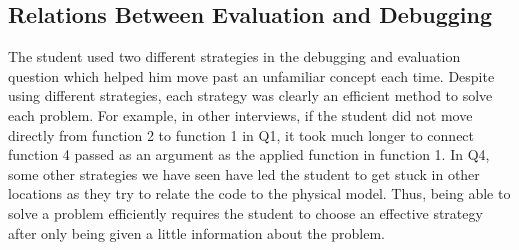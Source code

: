 \subsection{Relations Between Evaluation and Debugging}
%
%

The student used two different strategies in the debugging and evaluation question which helped him move past an unfamiliar concept each time. Despite using different strategies, each strategy was clearly an efficient method to solve each problem. For example, in other interviews, if the student did not move directly from function 2 to function 1 in Q1, it took much longer to connect function 4 passed as an argument as the applied function in function 1. In Q4, some other strategies we have seen have led the student to get stuck in other locations as they try to relate the code to the physical model. Thus, being able to solve a problem efficiently requires the student to choose an effective strategy after only being given a little information about the problem. 





